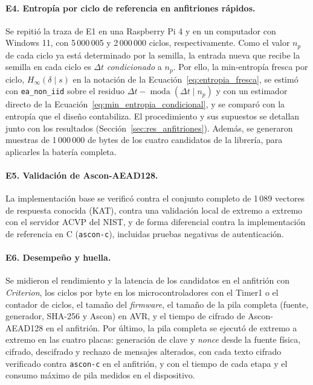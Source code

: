 \paragraph{E4. Entropía por ciclo de referencia en anfitriones rápidos.} Se repitió la traza de E1 en una Raspberry Pi 4 y en un computador con Windows 11, con 5\,000\,005 y 2\,000\,000 ciclos, respectivamente. Como el valor $n_p$ de cada ciclo ya está determinado por la semilla, la entrada nueva que recibe la semilla en cada ciclo es $\Delta t$ \emph{condicionado} a $n_p$. Por ello, la min-entropía fresca por ciclo, $H_\infty(\delta \mid s)$ en la notación de la Ecuación~\eqref{eq:entropia_fresca}, se estimó con \texttt{ea\_non\_iid} sobre el residuo $\Delta t - \operatorname{moda}(\Delta t \mid n_p)$ y con un estimador directo de la Ecuación~\eqref{eq:min_entropia_condicional}, y se comparó con la entropía que el diseño contabiliza. El procedimiento y sus supuestos se detallan junto con los resultados (Sección~\ref{sec:res_anfitriones}). Además, se generaron muestras de 1\,000\,000 de bytes de los cuatro candidatos de la librería, para aplicarles la batería completa.

\paragraph{E5. Validación de Ascon-AEAD128.} La implementación base se verificó contra el conjunto completo de 1\,089 vectores de respuesta conocida (KAT), contra una validación local de extremo a extremo con el servidor ACVP del NIST, y de forma diferencial contra la implementación de referencia en C (\texttt{ascon-c}), incluidas pruebas negativas de autenticación.

\paragraph{E6. Desempeño y huella.} Se midieron el rendimiento y la latencia de los candidatos en el anfitrión con \textit{Criterion}, los ciclos por byte en los microcontroladores con el Timer1 o el contador de ciclos, el tamaño del \textit{firmware}, el tamaño de la pila completa (fuente, generador, SHA-256 y Ascon) en AVR, y el tiempo de cifrado de Ascon-AEAD128 en el anfitrión. Por último, la pila completa se ejecutó de extremo a extremo en las cuatro placas: generación de clave y \textit{nonce} desde la fuente física, cifrado, descifrado y rechazo de mensajes alterados, con cada texto cifrado verificado contra \texttt{ascon-c} en el anfitrión, y con el tiempo de cada etapa y el consumo máximo de pila medidos en el dispositivo.

